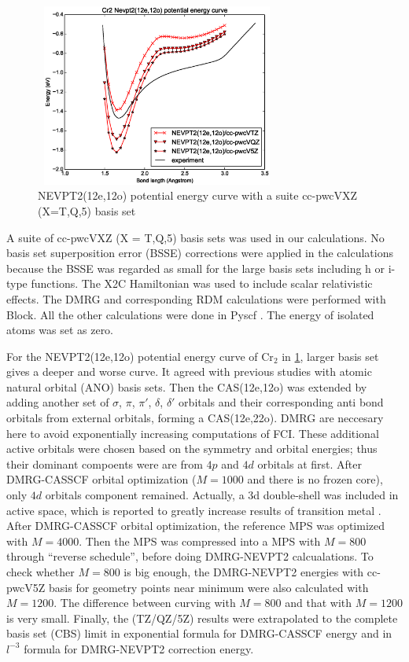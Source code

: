 \begin{figure}\label{fig:12o_nevpt2}
  \includegraphics[width=8cm,height=6cm]{application/12o-nevpt2.eps}
  \caption{NEVPT2(12e,12o) potential energy curve with a suite cc-pwcVXZ (X=T,Q,5) basis set}
\end{figure}

A suite of cc-pwcVXZ (X = T,Q,5) basis sets was used in our calculations. No basis set superposition error (BSSE) corrections were applied in the calculations because the BSSE was regarded as small for the large basis sets including h or i-type functions. The X2C Hamiltonian was used to include scalar relativistic effects. The DMRG and corresponding RDM calculations were performed with Block\cite{sharma_spin-adapted_2012}. All the other calculations were done in Pyscf \cite{sun_pyscf}.
The energy of isolated atoms was set as zero.

For the NEVPT2(12e,12o) potential energy curve of Cr$_2$ in \ref{fig:12o_nevpt2}, larger basis set gives a deeper and worse curve. It agreed with previous studies with atomic natural orbital (ANO) basis sets.\cite{angeli_third-order_2006}
Then the CAS(12e,12o) was extended by adding another set of $\sigma$, $\pi$, $\pi'$, $\delta$, $\delta'$ orbitals and their corresponding anti bond orbitals from external orbitals, forming a CAS(12e,22o). 
DMRG are neccesary here to avoid exponentially increasing computations of FCI.
These additional active orbitals were chosen based on the symmetry and orbital energies; thus their dominant compoents were are from $4p$ and $4d$ orbitals at first. After DMRG-CASSCF orbital optimization ($M=1000$ and there is no frozen core), only $4d$ orbitals component remained. Actually, a 3d double-shell was included in active space, which is reported to greatly increase results of transition metal \cite{andersson_excitation_1992}.
After DMRG-CASSCF orbital optimization, the reference MPS was optimized with $M=4000$. Then the MPS was compressed into a MPS with $M=800$ through ``reverse schedule'', before doing DMRG-NEVPT2 calcualations. To check whether $M=800$ is big enough, the DMRG-NEVPT2 energies with cc-pwcV5Z basis for geometry points near minimum were also calculated with $M=1200$. The difference between curving with $M=800$ and that with $M=1200$ is very small. Finally, the (TZ/QZ/5Z) results were extrapolated to the complete basis set (CBS) limit in exponential formula for DMRG-CASSCF energy and in $l^{-3}$ formula for DMRG-NEVPT2 correction energy.



